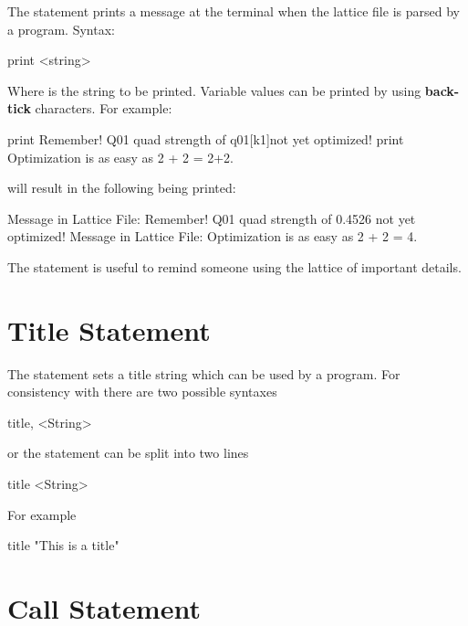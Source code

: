 {{{The  statement prints a message at the terminal when the 
lattice file is parsed by a program. Syntax:
\begin{example}
  print <string>
\end{example}
Where  is the string to be printed. Variable values can be printed by using
\textbf{back-tick} characters. For example:
\begin{example}
  print Remember! Q01 quad strength of \backtick{}q01[k1]\backtick not yet optimized!
  print Optimization is as easy as 2 + 2 = \backtick{}2+2\backtick.
\end{example}
will result in the following being printed:
\begin{example}
  Message in Lattice File: Remember! Q01 quad strength of 0.4526 not yet optimized!
  Message in Lattice File: Optimization is as easy as 2 + 2 = 4.
\end{example}

The  statement is useful to remind someone using the lattice of important details.

\section{Title Statement}

The  statement sets a title string which can be used by a program. 
For consistency with \mad there are two possible syntaxes
\begin{example}
  title, <String>
\end{example}
or the statement can be split into two lines
\begin{example}
  title
  <String>
\end{example}
For example
\begin{example}
  title
  "This is a title"
\end{example}

\section{Call Statement}
\label{s:call}

}}}
